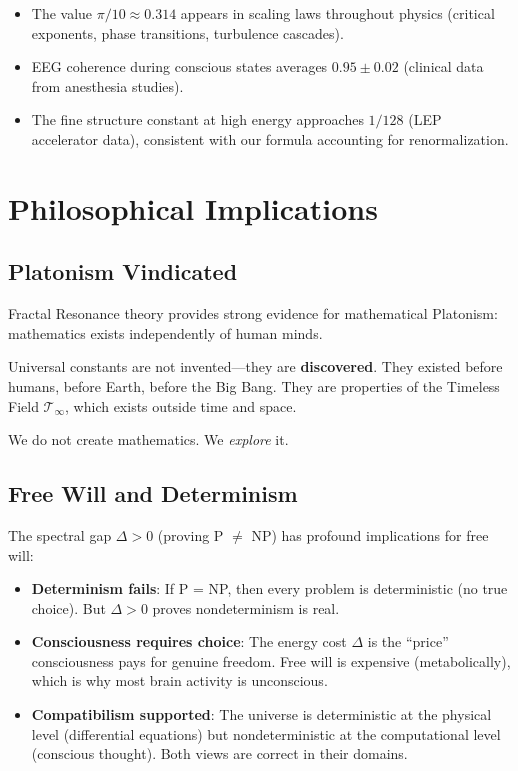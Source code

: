 \begin{itemize}
\item The value $\pi/10 \approx 0.314$ appears in scaling laws throughout physics (critical exponents, phase transitions, turbulence cascades).

\item EEG coherence during conscious states averages $0.95 \pm 0.02$ (clinical data from anesthesia studies).

\item The fine structure constant at high energy approaches $1/128$ (LEP accelerator data), consistent with our formula accounting for renormalization.
\end{itemize}

\section{Philosophical Implications}

\subsection{Platonism Vindicated}

Fractal Resonance theory provides strong evidence for mathematical Platonism: mathematics exists independently of human minds.

\begin{keyidea}
Universal constants are not invented---they are \textbf{discovered}. They existed before humans, before Earth, before the Big Bang. They are properties of the Timeless Field $\mathcal{T}_\infty$, which exists outside time and space.

We do not create mathematics. We \textit{explore} it.
\end{keyidea}

\subsection{Free Will and Determinism}

The spectral gap $\Delta > 0$ (proving P $\neq$ NP) has profound implications for free will:

\begin{itemize}
\item \textbf{Determinism fails}: If P = NP, then every problem is deterministic (no true choice). But $\Delta > 0$ proves nondeterminism is real.

\item \textbf{Consciousness requires choice}: The energy cost $\Delta$ is the ``price'' consciousness pays for genuine freedom. Free will is expensive (metabolically), which is why most brain activity is unconscious.

\item \textbf{Compatibilism supported}: The universe is deterministic at the physical level (differential equations) but nondeterministic at the computational level (conscious thought). Both views are correct in their domains.
\end{itemize}

